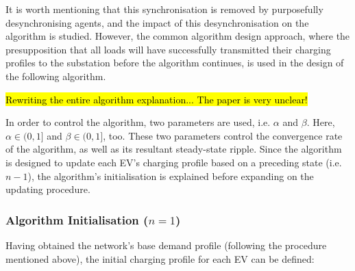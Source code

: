 It is worth mentioning that this synchronisation is removed by purposefully desynchronising agents, and the impact of this desynchronisation on the algorithm is studied.
However, the common algorithm design approach, where the presupposition that all loads will have successfully transmitted their charging profiles to the substation before the algorithm continues, is used in the design of the following algorithm.

\hl{Rewriting the entire algorithm explanation... The paper is very unclear!}



In order to control the algorithm, two parameters are used, i.e. $\alpha$ and $\beta$.
Here, $\alpha \in (0, 1]$ and $\beta \in (0, 1]$, too.
These two parameters control the convergence rate of the algorithm, as well as its resultant steady-state ripple.
Since the algorithm is designed to update each EV's charging profile based on a preceding state (i.e. $n-1$), the algorithm's initialisation is explained before expanding on the updating procedure.

\subsubsection{Algorithm Initialisation ($n=1$)}

Having obtained the network's base demand profile (following the procedure mentioned above), the initial charging profile for each EV can be defined:















